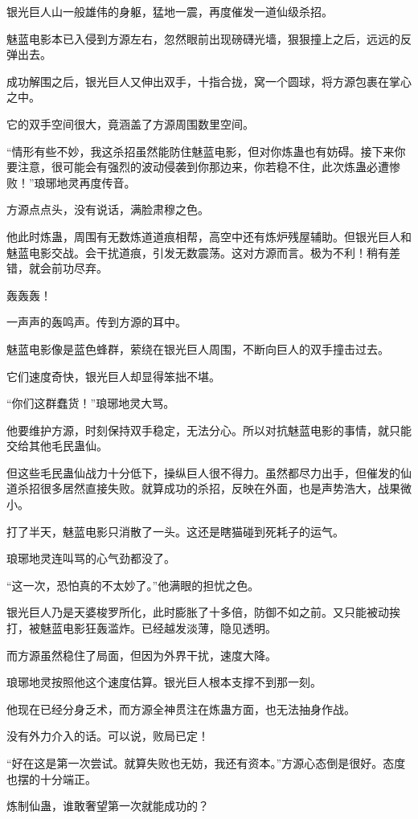 \begin{this_body}
银光巨人山一般雄伟的身躯，猛地一震，再度催发一道仙级杀招。

魅蓝电影本已入侵到方源左右，忽然眼前出现磅礴光墙，狠狠撞上之后，远远的反弹出去。

成功解围之后，银光巨人又伸出双手，十指合拢，窝一个圆球，将方源包裹在掌心之中。

它的双手空间很大，竟涵盖了方源周围数里空间。

“情形有些不妙，我这杀招虽然能防住魅蓝电影，但对你炼蛊也有妨碍。接下来你要注意，很可能会有强烈的波动侵袭到你那边来，你若稳不住，此次炼蛊必遭惨败！”琅琊地灵再度传音。

方源点点头，没有说话，满脸肃穆之色。

他此时炼蛊，周围有无数炼道道痕相帮，高空中还有炼炉残屋辅助。但银光巨人和魅蓝电影交战。会干扰道痕，引发无数震荡。这对方源而言。极为不利！稍有差错，就会前功尽弃。

轰轰轰！

一声声的轰鸣声。传到方源的耳中。

魅蓝电影像是蓝色蜂群，萦绕在银光巨人周围，不断向巨人的双手撞击过去。

它们速度奇快，银光巨人却显得笨拙不堪。

“你们这群蠢货！”琅琊地灵大骂。

他要维护方源，时刻保持双手稳定，无法分心。所以对抗魅蓝电影的事情，就只能交给其他毛民蛊仙。

但这些毛民蛊仙战力十分低下，操纵巨人很不得力。虽然都尽力出手，但催发的仙道杀招很多居然直接失败。就算成功的杀招，反映在外面，也是声势浩大，战果微小。

打了半天，魅蓝电影只消散了一头。这还是瞎猫碰到死耗子的运气。

琅琊地灵连叫骂的心气劲都没了。

“这一次，恐怕真的不太妙了。”他满眼的担忧之色。

银光巨人乃是天婆梭罗所化，此时膨胀了十多倍，防御不如之前。又只能被动挨打，被魅蓝电影狂轰滥炸。已经越发淡薄，隐见透明。

而方源虽然稳住了局面，但因为外界干扰，速度大降。

琅琊地灵按照他这个速度估算。银光巨人根本支撑不到那一刻。

他现在已经分身乏术，而方源全神贯注在炼蛊方面，也无法抽身作战。

没有外力介入的话。可以说，败局已定！

“好在这是第一次尝试。就算失败也无妨，我还有资本。”方源心态倒是很好。态度也摆的十分端正。

炼制仙蛊，谁敢奢望第一次就能成功的？


\end{this_body}
